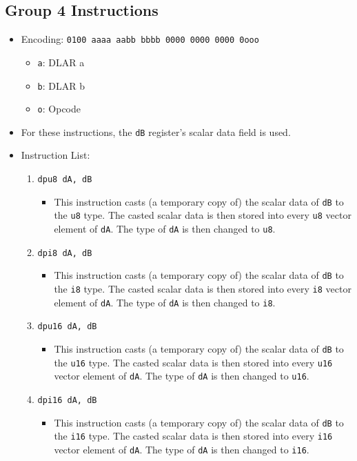\documentclass{article}
\begin{document}
	\subsection{Group 4 Instructions}
		\begin{itemize}
		\item Encoding: \texttt{0100 aaaa aabb bbbb  0000 0000 0000 0ooo}
			\begin{itemize}
			\item \texttt{a}:  DLAR a
			\item \texttt{b}:  DLAR b
			\item \texttt{o}:  Opcode
			\end{itemize}

		\item For these instructions, the \texttt{dB} register's scalar
		data field is used.

		\item Instruction List:
			\begin{enumerate}
			\item \texttt{dpu8 dA, dB}
				\begin{itemize}
				\item This instruction casts (a temporary copy of) the
				scalar data of \texttt{dB} to the \texttt{u8} type.  The
				casted scalar data is then stored into every \texttt{u8}
				vector element of \texttt{dA}.  The type of \texttt{dA} is
				then changed to \texttt{u8}.
				\end{itemize}
			\item \texttt{dpi8 dA, dB}
				\begin{itemize}
				\item This instruction casts (a temporary copy of) the
				scalar data of \texttt{dB} to the \texttt{i8} type.  The
				casted scalar data is then stored into every \texttt{i8}
				vector element of \texttt{dA}.  The type of \texttt{dA} is
				then changed to \texttt{i8}.
				\end{itemize}
			\item \texttt{dpu16 dA, dB}
				\begin{itemize}
				\item This instruction casts (a temporary copy of) the
				scalar data of \texttt{dB} to the \texttt{u16} type.  The
				casted scalar data is then stored into every \texttt{u16}
				vector element of \texttt{dA}.  The type of \texttt{dA} is
				then changed to \texttt{u16}.
				\end{itemize}
			\item \texttt{dpi16 dA, dB}
				\begin{itemize}
				\item This instruction casts (a temporary copy of) the
				scalar data of \texttt{dB} to the \texttt{i16} type.  The
				casted scalar data is then stored into every \texttt{i16}
				vector element of \texttt{dA}.  The type of \texttt{dA} is
				then changed to \texttt{i16}.
				\end{itemize}


\end{enumerate}
\end{itemize}
\end{document}
